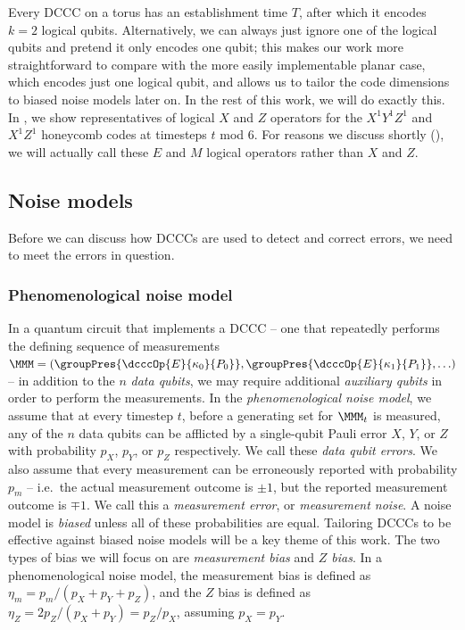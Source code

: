 Every DCCC on a torus has an establishment time $T$, after which it encodes $k=2$ logical qubits.
Alternatively, we can always just ignore one of the logical qubits and pretend it only encodes one qubit; this makes our work more straightforward to compare with the more easily implementable planar case, which encodes just one logical qubit, and allows us to tailor the code dimensions to biased noise models later on.
In the rest of this work, we will do exactly this.
In , we show representatives of logical $X$ and $Z$ operators for the $X^1Y^1Z^1$ and $X^1Z^1$ honeycomb codes at timesteps $t$ mod $6$.
For reasons we discuss shortly (), we will actually call these $E$ and $M$ logical operators rather than $X$ and $Z$.

\subsection{Noise models}\label{subsec:noise_models}

Before we can discuss how DCCCs are used to detect and correct errors, we need to meet the errors in question.

\subsubsection{Phenomenological noise model}
In a quantum circuit that implements a DCCC -- one that repeatedly performs the defining sequence of measurements $\MMM = (\groupPres{\dcccOp{E}{\kappa_0}{P_0}}, \groupPres{\dcccOp{E}{\kappa_1}{P_1}}, \ldots)$ --
in addition to the $n$ \textit{data qubits},
we may require additional \textit{auxiliary qubits} in order to perform the measurements.
In the \textit{phenomenological noise model},
we assume that at every timestep $t$,
before a generating set for $\MMM_t$ is measured,
any of the $n$ data qubits can be afflicted by a single-qubit Pauli error $X$, $Y$, or $Z$ with probability $p_X$, $p_Y$, or $p_Z$ respectively.
We call these \textit{data qubit errors}.
We also assume that every measurement can be erroneously reported with probability $p_m$ --
i.e.\ the actual measurement outcome is $\pm 1$, but the reported measurement outcome is $\mp 1$.
We call this a \textit{measurement error}, or \textit{measurement noise}.
A noise model is \textit{biased} unless all of these probabilities are equal.
Tailoring DCCCs to be effective against biased noise models will be a key theme of this work.
The two types of bias we will focus on are \textit{measurement bias} and \textit{$Z$ bias}.
In a phenomenological noise model, the measurement bias is defined as
$\eta_m = p_m/(p_X + p_Y + p_Z)$,
and the $Z$ bias is defined as
$\eta_Z = 2p_Z/(p_X+p_Y)=p_Z/p_X$, assuming $p_X=p_Y$.

